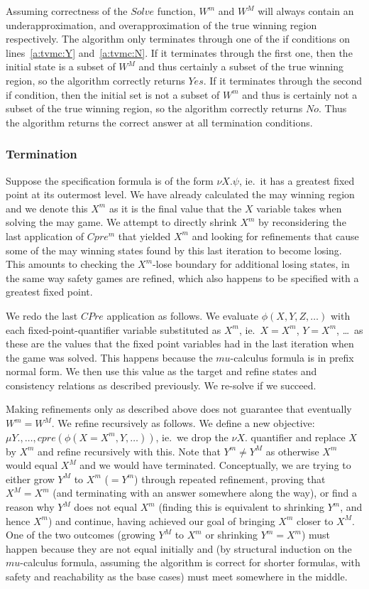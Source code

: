Assuming correctness of the $Solve$ function, $W^m$ and $W^M$ will always contain an underapproximation, and overapproximation of the true winning region respectively. The algorithm only terminates through one of the if conditions on lines~\ref{a:tvmc:Y} and~\ref{a:tvmc:N}. If it terminates through the first one, then the initial state is a subset of $W^M$ and thus certainly a subset of the true winning region, so the algorithm correctly returns $Yes$. If it terminates through the second if condition, then the initial set is not a subset of $W^m$ and thus is certainly not a subset of the true winning region, so the algorithm correctly returns $No$. Thus the algorithm returns the correct answer at all termination conditions.

\subsubsection{Termination}

Suppose the specification formula is of the form $\nu X. \psi$, ie.\ it has a greatest fixed point at its outermost level. We have already calculated the may winning region and we denote this $X^m$ as it is the final value that the $X$ variable takes when solving the may game. We attempt to directly shrink $X^m$ by reconsidering the last application of $Cpre^m$ that yielded $X^m$ and looking for refinements that cause some of the may winning states found by this last iteration to become losing. This amounts to checking the $X^m$-lose boundary for additional losing states, in the same way safety games are refined, which also happens to be specified with a greatest fixed point.

We redo the last $CPre$ application as follows. We evaluate $\phi(X, Y, Z, \ldots)$ with each fixed-point-quantifier variable substituted as $X^m$, ie.\ $X=X^m$, $Y=X^m$, \ldots \ as these are the values that the fixed point variables had in the last iteration when the game was solved. This happens because the $mu$-calculus formula is in prefix normal form. We then use this value as the target and refine states and consistency relations as described previously. We re-solve if we succeed.

Making refinements only as described above does not guarantee that eventually $W^m = W^M$. We refine recursively as follows. We define a new objective: $\mu Y., \ldots, cpre(\phi(X=X^m, Y, \ldots))$, ie.\ we drop the $\nu X.$ quantifier and replace $X$ by $X^m$ and refine recursively with this. Note that $Y^m \neq Y^M$ as otherwise $X^m$ would equal $X^M$ and we would have terminated. Conceptually, we are trying to either grow $Y^M$ to $X^m$ ($=Y^m$) through repeated refinement, proving that $X^M = X^m$ (and terminating with an answer somewhere along the way), or find a reason why $Y^M$ does not equal $X^m$ (finding this is equivalent to shrinking $Y^m$, and hence $X^m$) and continue, having achieved our goal of bringing $X^m$ closer to $X^M$. One of the two outcomes (growing $Y^M$ to $X^m$ or shrinking $Y^m = X^m$) must happen because they are not equal initially and (by structural induction on the $mu$-calculus formula, assuming the algorithm is correct for shorter formulas, with safety and reachability as the base cases) must meet somewhere in the middle.

